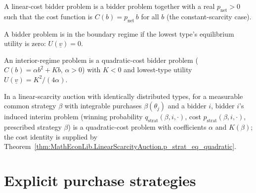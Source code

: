 \begin{definition}\label{def:MathEconLib.LinearCostProblem}
\leanok
{}
A linear-cost bidder problem is a bidder problem together with a real $p_{\mathrm{net}} > 0$ such that the cost function is $C(b) = p_{\mathrm{net}}\, b$ for all $b$ (the constant-scarcity case).
\end{definition}

\begin{definition}\label{def:MathEconLib.BidderProblem.IsBoundaryRegime}
\leanok
{}
A bidder problem is in the boundary regime if the lowest type's equilibrium utility is zero: $U(\underline v) = 0$.
\end{definition}

\begin{definition}\label{def:MathEconLib.InteriorRegimeProblem}
\leanok
{}
An interior-regime problem is a quadratic-cost bidder problem ($C(b) = \alpha b^2 + K b$, $\alpha > 0$) with $K < 0$ and lowest-type utility $U(\underline v) = K^2/(4\alpha)$.
\end{definition}

\begin{definition}\label{def:MathEconLib.LinearScarcityAuction.toQuadraticCostProblem}
\leanok
{}
In a linear-scarcity auction with identically distributed types, for a measurable common strategy $\beta$ with integrable purchases $\beta(\theta_j)$ and a bidder $i$, bidder $i$'s induced interim problem (winning probability $q_{\mathrm{strat}}(\beta,i,\cdot)$, cost $p_{\mathrm{strat}}(\beta,i,\cdot)$, prescribed strategy $\beta$) is a quadratic-cost problem with coefficients $\alpha$ and $K(\beta)$; the cost identity is supplied by Theorem~\ref{thm:MathEconLib.LinearScarcityAuction.p_strat_eq_quadratic}.
\end{definition}

\section{Explicit purchase strategies}

